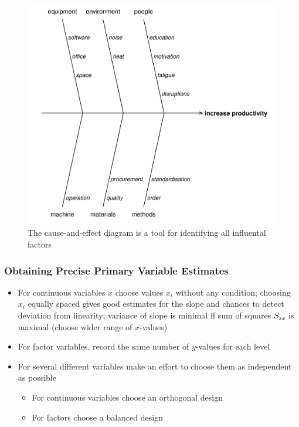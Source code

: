 \documentclass[11pt]{article}
\theoremstyle{definition}
\begin{document}
\begin{figure}[H]
	\centering
	\includegraphics[width=0.6\linewidth]{img/cause_and_effect_diagram}
	\caption{The cause-and-effect diagram is a tool for identifying all influental factors}
	\label{fig:causeandeffectdiagram}
\end{figure}

\subsubsection{Obtaining Precise Primary Variable Estimates}
\begin{itemize}
	\item For continuous variables $x$ choose values $x_i$ without any condition; choosing $x_i$ equally spaced gives good estimates for the slope and chances to detect deviation from linearity; variance of slope is minimal if sum of squares $S_{xx}$ is maximal (choose wider range of $x$-values)
	\item For factor variables, record the same number of $y$-values for each level
	\item For several different variables make an effort to choose them as independent as possible
	\begin{itemize}
		\item For continuous variables choose an orthogonal design
		\item For factors choose a balanced design
	\end{itemize}
\end{itemize}
\end{document}
